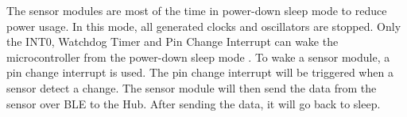 The sensor modules are most of the time in power-down sleep mode to reduce power usage. In this mode, all generated clocks and oscillators are stopped. Only the INT0, Watchdog Timer and Pin Change Interrupt can wake the microcontroller from the power-down sleep mode \cite{ATtiny24/44/84}.
To wake a sensor module, a pin change interrupt is used. The pin change interrupt will be triggered when a sensor detect a change. The sensor module will then send the data from the sensor over BLE to the Hub. After sending the data, it will go back to sleep.


